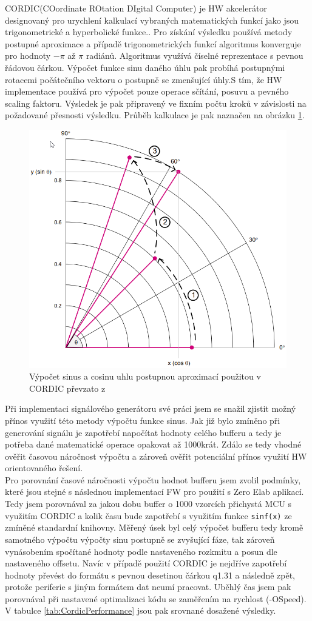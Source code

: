 CORDIC(COordinate ROtation DIgital Computer) je HW akcelerátor designovaný pro urychlení kalkulací vybraných matematických funkcí jako jsou trigonometrické a hyperbolické funkce.\cite{CORDIC}. Pro získání výsledku používá metody postupné aproximace a případě trigonometrických funkcí algoritmus konverguje pro hodnoty $-\pi$ až $\pi$ radiánů. Algoritmus využívá číselné reprezentace s pevnou řádovou čárkou.  Výpočet funkce sinu daného úhlu pak probíhá postupnými rotacemi počátečního vektoru o postupně se zmenšující úhly.S tím, že HW implementace používá pro výpočet pouze operace sčítání, posuvu a pevného scaling faktoru. Výsledek je pak připravený ve fixním počtu kroků v závislosti na požadované přesnosti výsledku. Průběh kalkulace je pak naznačen na obrázku \ref{fig:cordicoperation}. 

\begin{figure}[H]
	\centering
	\includegraphics[width=0.5\linewidth]{Figs/Screenshots/CORDIC_Operation}
	\caption{Výpočet sinus a cosinu uhlu postupnou aproximací použitou v CORDIC převzato z \cite{AN_Cordic}}
	\label{fig:cordicoperation}
\end{figure}

Při implementaci signálového generátoru své práci jsem se snažil zjistit možný přínos využití této metody výpočtu funkce sinus. Jak již bylo zmíněno při generování signálu je zapotřebí napočítat hodnoty celého bufferu a tedy je potřeba dané matematické operace opakovat až 1000krát. Zdálo se tedy vhodné ověřit časovou náročnost výpočtu a zároveň ověřit potenciální přínos využití HW orientovaného řešení.\\

 Pro porovnání časové náročnosti výpočtu hodnot bufferu jsem zvolil podmínky, které jsou stejné s následnou implementací FW pro použití s Zero Elab aplikací. Tedy jsem porovnával za jakou dobu buffer o 1000 vzorcích přichystá MCU s využitím CORDIC a kolik času bude zapotřebí s využitím  funkce \texttt{sinf(x)} ze zmíněné standardní knihovny. Měřený úsek byl celý výpočet bufferu tedy kromě samotného výpočtu výpočty sinu postupně se zvyšující fáze, tak zároveň vynásobením spočítané hodnoty podle nastaveného rozkmitu a posun dle nastaveného offsetu. Navíc v případě použití CORDIC je nejdříve zapotřebí hodnoty převést do formátu s pevnou desetinou čárkou q1.31 a následně zpět, protože periferie s jiným formátem dat neumí pracovat. Uběhlý čas jsem pak porovnával při nastavené optimalizaci kódu se zaměřením na rychlost (-OSpeed). V tabulce \ref{tab:CordicPerformance} jsou pak srovnané dosažené výsledky.

